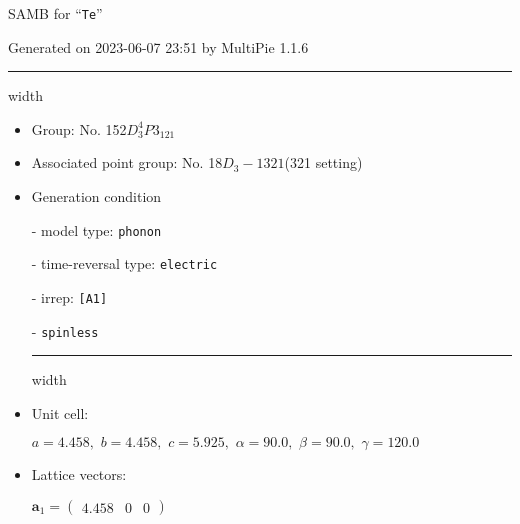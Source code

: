 \documentclass[fleqn,10pt,landscape]{article}
\begin{document}
\setcounter{MaxMatrixCols}{16}

\setlength{\baselineskip}{16pt}
\footnotesize
\begin{center}
\LARGE
SAMB for ``\texttt{Te}''
\end{center}
\begin{flushright}
Generated on 2023-06-07 23:51 by MultiPie 1.1.6
\end{flushright}
\vspace{1cm}


 \hfil \hrule height 1mm width \textwidth \hfil

\begin{itemize}
\item Group: No. 152\quad$D_{3}^{4}$\quad$P3_121$\quad[ trigonal ]

\item Associated point group: No. 18\quad$D_{3}-1$\quad$321$\quad(321 setting)\quad[ trigonal ]

\vspace{5mm}

\item Generation condition

\quad - model type: \texttt{phonon}

\quad - time-reversal type: \texttt{electric}

\quad - irrep: \texttt{[A1]}

\quad - \texttt{spinless}


 \hfil \hrule height 1mm width \textwidth \hfil

\item Unit cell:

\quad $a=4.458,\,\, b=4.458,\,\, c=5.925,\,\, \alpha=90.0,\,\, \beta=90.0,\,\, \gamma=120.0$

\item Lattice vectors:

\quad $\bm{a}_1=\begin{pmatrix} 4.458 & 0 & 0 \end{pmatrix}$


\end{itemize}
\end{document}

